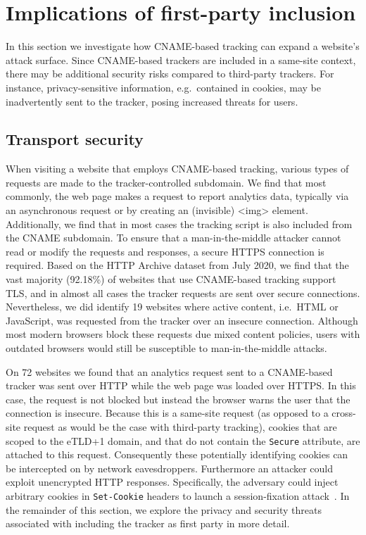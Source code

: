 \section{Implications of first-party inclusion}
\label{sec:implications-of-cname-tracking}
In this section we investigate how CNAME-based tracking can expand a website’s attack surface.
Since CNAME-based trackers are included in a same-site context, there may be additional security risks compared to third-party trackers. For instance, privacy-sensitive information, e.g.\ contained in cookies, may be inadvertently sent to the tracker, posing increased threats for users.

\subsection{Transport security}
When visiting a website that employs CNAME-based tracking, various types of requests are made to the tracker-controlled subdomain.
We find that most commonly, the web page makes a request to report analytics data, typically via an asynchronous request or by creating an (invisible) <img> element.
Additionally, we find that in most cases the tracking script is also included from the CNAME subdomain. 
To ensure that a man-in-the-middle attacker cannot read or modify the requests and responses, a secure HTTPS connection is required.
Based on the HTTP Archive dataset from July 2020, we find that the vast majority (92.18\%) of websites that use CNAME-based tracking support TLS, and in almost all cases the tracker requests are sent over secure connections.
Nevertheless, we did identify 19 websites where active content, i.e.\ HTML or JavaScript, was requested from the tracker over an insecure connection.
Although most modern browsers block these requests due mixed content policies, users with outdated browsers would still be susceptible to man-in-the-middle attacks.

On 72 websites we found that an analytics request sent to a CNAME-based tracker was sent over HTTP while the web page was loaded over HTTPS.
In this case, the request is not blocked but instead the browser warns the user that the connection is insecure.
Because this is a same-site request (as opposed to a cross-site request as would be the case with third-party tracking), cookies that are scoped to the eTLD+1 domain, and that do not contain the \texttt{Secure} attribute, are attached to this request.
Consequently these potentially identifying cookies can be intercepted on by network eavesdroppers.
Furthermore an attacker could exploit unencrypted HTTP responses.
Specifically, the adversary could inject arbitrary cookies in \texttt{Set-Cookie} headers to
launch a session-fixation attack~\cite{kolvsek2002session,schrank2010session}.
In the remainder of this section, we explore the privacy and security threats associated with including the tracker as first party in more detail.


